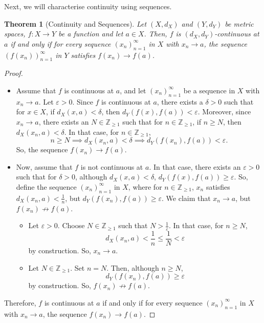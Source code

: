 \documentclass[a4paper, openany]{memoir}
\theoremstyle{definition}
\theoremstyle{plain}
\newtheorem{theorem}[definition]{Theorem}
\begin{document}
Next, we will characterise continuity using sequences.
\begin{theorem}[Continuity and Sequences]
Let $(X, d_X)$ and $(Y, d_Y)$ be metric spaces, $f: X \to Y$ be a function and let $a \in X$. Then, $f$ is $(d_X, d_Y)$-continuous at $a$ if and only if for every sequence $(x_n)_{n=1}^{\infty}$ in $X$ with $x_n \to a$, the sequence $(f(x_n))_{n=1}^{\infty}$ in $Y$ satisfies $f(x_n) \to f(a)$.
\end{theorem}
\begin{proof}
\hspace*{0pt}
\begin{itemize}
    \item Assume that $f$ is continuous at $a$, and let $(x_n)_{n=1}^{\infty}$ be a sequence in $X$ with $x_n \to a$. Let $\varepsilon > 0$. Since $f$ is continuous at $a$, there exists a $\delta > 0$ such that for $x \in X$, if $d_X(x, a) < \delta$, then $d_Y(f(x), f(a)) < \varepsilon$. Moreover, since $x_n \to a$, there exists an $N \in \mathbb{Z}_{\geqslant 1}$ such that for $n \in \mathbb{Z}_{\geqslant 1}$, if $n \geqslant N$, then $d_X(x_n, a) < \delta$. In that case, for $n \in \mathbb{Z}_{\geqslant 1}$,
    \[n \geqslant N \implies d_X(x_n, a) < \delta \implies d_Y(f(x_n), f(a)) < \varepsilon.\]
    So, the sequence $f(x_n) \to f(a)$.
    
    \item Now, assume that $f$ is not continuous at $a$. In that case, there exists an $\varepsilon > 0$ such that for $\delta > 0$, although $d_X(x, a) < \delta$, $d_Y(f(x), f(a)) \geqslant \varepsilon$. So, define the sequence $(x_n)_{n=1}^{\infty}$ in $X$, where for $n \in \mathbb{Z}_{\geqslant 1}$, $x_n$ satisfies $d_X(x_n, a) < \frac{1}{n}$, but $d_Y(f(x_n), f(a)) \geqslant \varepsilon$. We claim that $x_n \to a$, but $f(x_n) \not\to f(a)$.
    \begin{itemize}
        \item Let $\varepsilon > 0$. Choose $N \in \mathbb{Z}_{\geqslant 1}$ such that $N > \frac{1}{\varepsilon}$. In that case, for $n \geqslant N$,
        \[d_X(x_n, a) < \frac{1}{n} \leqslant \frac{1}{N} < \varepsilon\]
        by construction. So, $x_n \to a$.
        
        \item Let $N \in \mathbb{Z}_{\geqslant 1}$. Set $n = N$. Then, although $n \geqslant N$, 
        \[d_Y(f(x_n), f(a)) \geqslant \varepsilon\]
        by construction. So, $f(x_n) \not\to f(a)$.
    \end{itemize}
\end{itemize}
Therefore, $f$ is continuous at $a$ if and only if for every sequence $(x_n)_{n=1}^{\infty}$ in $X$ with $x_n \to a$, the sequence $f(x_n) \to f(a)$.
\end{proof}
\end{document}
